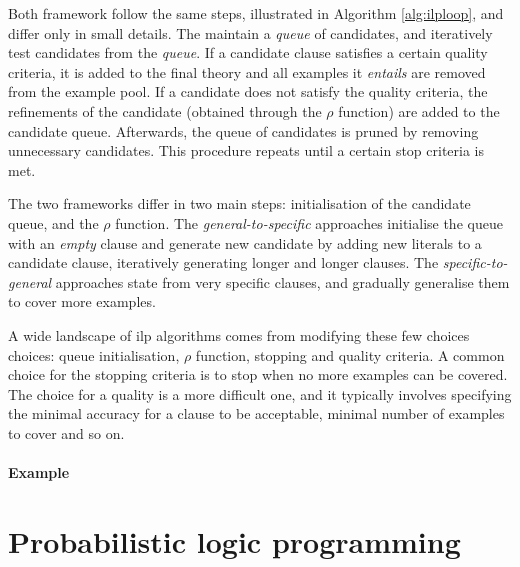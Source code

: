 Both framework follow the same steps, illustrated in Algorithm \ref{alg:ilploop}, and differ only in small details.
The maintain a \textit{queue} of candidates, and iteratively test candidates from the \textit{queue}.
If a candidate clause satisfies a certain quality criteria, it is added to the final theory and all examples it \textit{entails} are removed from the example pool.
If a candidate does not satisfy the quality criteria, the refinements of the candidate (obtained through the $\rho$ function) are added to the candidate queue.
Afterwards, the queue of candidates is pruned by removing unnecessary candidates.
This procedure repeats until a certain stop criteria is met.



The two frameworks differ in two main steps: initialisation of the candidate queue, and the $\rho$ function.
The \textit{general-to-specific} approaches initialise the queue with an \textit{empty} clause and generate new candidate by adding new literals to a candidate clause, iteratively generating longer and longer clauses.
The \textit{specific-to-general} approaches state from very specific clauses, and gradually generalise them to cover more examples.




A wide landscape of \gls{ilp} algorithms comes from modifying these few choices choices: queue initialisation, $\rho$ function, stopping and quality criteria.
A common choice for the stopping criteria is to stop when no more examples can be covered.
The choice for a quality is a more difficult one, and it typically involves specifying the minimal accuracy for a clause to be acceptable, minimal number of examples to cover and so on.




\paragraph{\textbf{Example}}







\section{Probabilistic logic programming}





